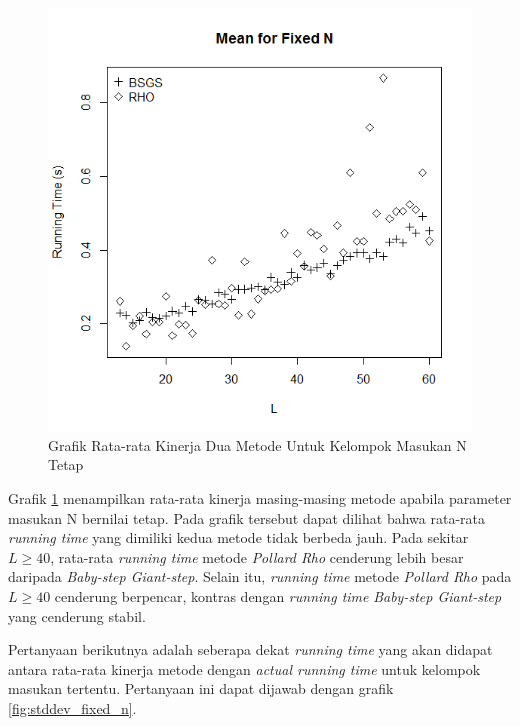 \begin{figure}[h!]
	\Centering
	\includegraphics[angle=0, scale=0.55]{bab5/img/mean-fixed-n}
	\caption{Grafik Rata-rata Kinerja Dua Metode Untuk Kelompok Masukan N Tetap}
	\label{fig:mean_fixed_n}
\end{figure}

Grafik \ref{fig:mean_fixed_n} menampilkan rata-rata kinerja masing-masing metode apabila parameter masukan N bernilai tetap. Pada grafik tersebut dapat dilihat bahwa rata-rata \textit{running time} yang dimiliki kedua metode tidak berbeda jauh. Pada sekitar $ L \geq 40 $, rata-rata \textit{running time} metode \textit{Pollard Rho} cenderung lebih besar daripada \textit{Baby-step Giant-step}. Selain itu, \textit{running time} metode \textit{Pollard Rho} pada $ L \geq 40 $ cenderung berpencar, kontras dengan \textit{running time} \textit{Baby-step Giant-step} yang cenderung stabil.

Pertanyaan berikutnya adalah seberapa dekat \textit{running time} yang akan didapat antara rata-rata kinerja metode dengan \textit{actual running time} untuk kelompok masukan tertentu. Pertanyaan ini dapat dijawab dengan grafik 
\ref{fig:stddev_fixed_n}.

